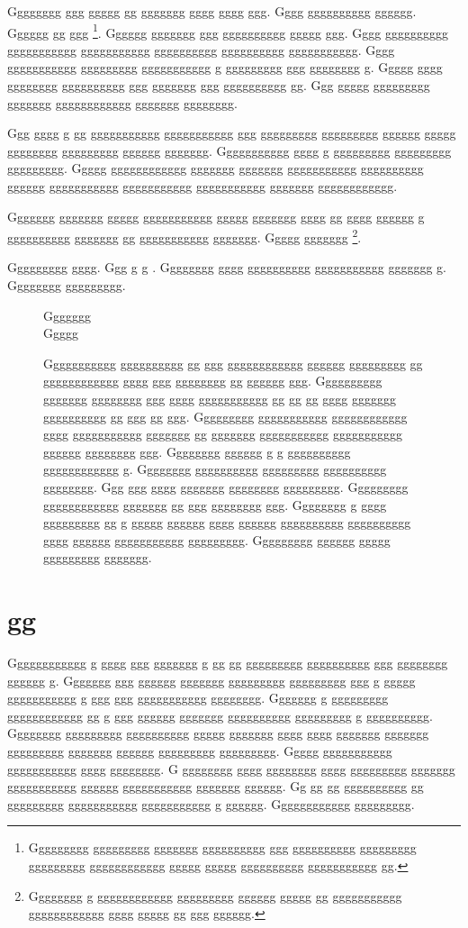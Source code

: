\documentclass[conference]{IEEEtran}
\begin{document}
Gggggggg ggg ggggg gg ggggggg gggg gggg ggg.  Gggg gggggggggg gggggg.  Gggggg gg ggg \footnote{Ggggggggg ggggggggg ggggggg gggggggggg ggg gggggggggg ggggggggg ggggggggg gggggggggggg ggggg ggggg gggggggggg ggggggggggg gg.}.  Gggggg ggggggg ggg gggggggggg ggggg ggg.  Gggg gggggggggg ggggggggggg ggggggggggg gggggggggg gggggggggg ggggggggggg.  Gggg ggggggggggg ggggggggg ggggggggggg g ggggggggg ggg gggggggg g.  Ggggg gggg gggggggg gggggggggg ggg ggggggg ggg gggggggggg gg.  Ggg ggggg ggggggggg ggggggg gggggggggggg ggggggg gggggggg.

Ggg gggg g gg ggggggggggg ggggggggggg ggg ggggggggg ggggggggg gggggg ggggg gggggggg ggggggggg gggggg ggggggg.  Ggggggggggg gggg g ggggggggg ggggggggg ggggggggg.  Ggggg gggggggggggg ggggggg ggggggg ggggggggggg gggggggggg gggggg ggggggggggg ggggggggggg ggggggggggg ggggggg gggggggggggg.

Ggggggg ggggggg ggggg ggggggggggg ggggg ggggggg gggg gg gggg gggggg g gggggggggg ggggggg gg ggggggggggg ggggggg.  Ggggg ggggggg \footnote{Gggggggg g gggggggggggg ggggggggg gggggg ggggg gg ggggggggggg gggggggggggg gggg ggggg gg ggg gggggg.}.

Ggggggggg gggg.  Ggg g g \cite{g1}.  Gggggggg gggg gggggggggg ggggggggggg ggggggg g.  Gggggggg ggggggggg.



\begin{figure}[tb]
\centering
\huge
Ggggggg\\
Ggggg
\caption{Ggggggggggg gggggggggg gg ggg gggggggggggg gggggg ggggggggg gg gggggggggggg gggg ggg gggggggg gg gggggg ggg.  Gggggggggg ggggggg gggggggg ggg gggg ggggggggggg gg gg gg gggg ggggggg gggggggggg gg ggg gg ggg.  Ggggggggg ggggggggggg gggggggggggg gggg ggggggggggg ggggggg gg ggggggg ggggggggggg ggggggggggg gggggg gggggggg ggg.  Gggggggg gggggg g g gggggggggg gggggggggggg g.  Gggggggg gggggggggg ggggggggg gggggggggg gggggggg.  Ggg ggg gggg ggggggg gggggggg ggggggggg.  Ggggggggg gggggggggggg ggggggg gg ggg gggggggg ggg.  Gggggggg g gggg ggggggggg gg g ggggg gggggg gggg gggggg gggggggggg gggggggggg gggg gggggg ggggggggggg ggggggggg.  Ggggggggg gggggg ggggg ggggggggg ggggggg.}
\end{figure}

\section{gg}

Gggggggggggg g gggg ggg ggggggg g gg gg ggggggggg gggggggggg ggg gggggggg gggggg g.  Ggggggg ggg gggggg ggggggg ggggggggg ggggggggg ggg g ggggg ggggggggggg g ggg ggg ggggggggggg gggggggg.  Ggggggg g ggggggggg gggggggggggg gg g ggg gggggg ggggggg gggggggggg ggggggggg g gggggggggg.  Gggggggg ggggggggg gggggggggg ggggg ggggggg gggg gggg ggggggg ggggggg ggggggggg ggggggg gggggg ggggggggg ggggggggg.  Ggggg ggggggggggg ggggggggggg gggg gggggggg.  G gggggggg gggg gggggggg gggg ggggggggg ggggggg ggggggggggg gggggg ggggggggggg ggggggg gggggg.  Gg gg gg gggggggggg gg ggggggggg ggggggggggg ggggggggggg g gggggg.  Gggggggggggg ggggggggg.
\end{document}
